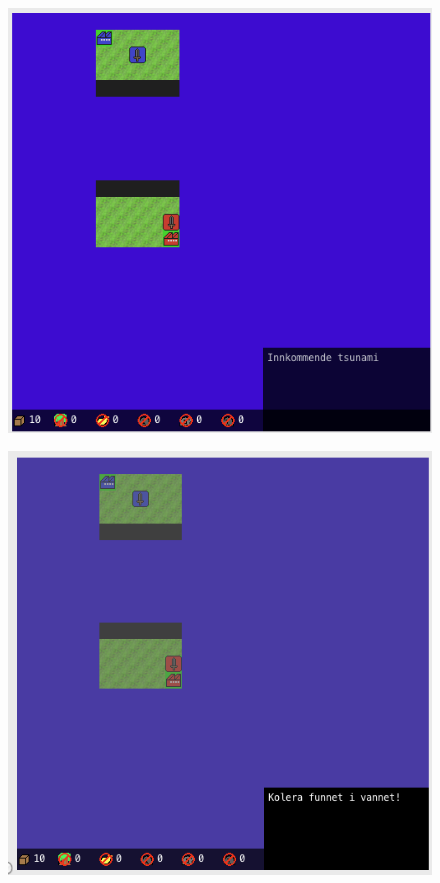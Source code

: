 \begin{center}
\begin{figure}
\includegraphics[scale=0.75]{images/Tsunami.png}
\label{fig:Tsunami}
\end{figure}
\end{center}

\begin{center}
\begin{figure}
\includegraphics[scale=0.75]{images/Kolera.png}
\label{fig:Kolera}
\end{figure}
\end{center}

